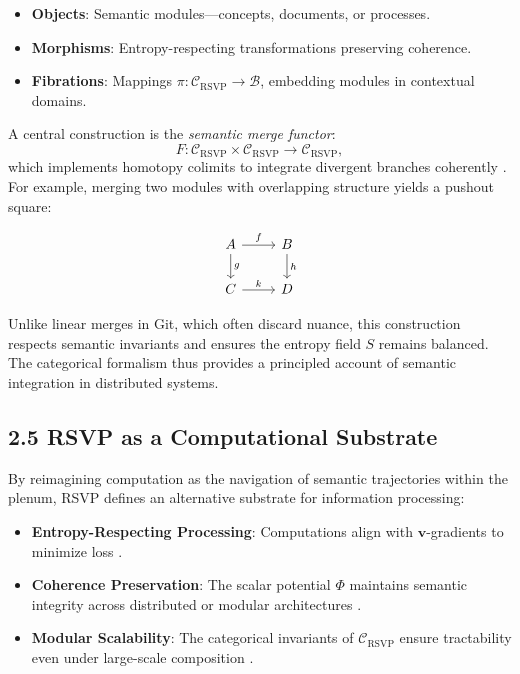 \documentclass[12pt]{article}
\begin{document}
\begin{itemize}
    \item \textbf{Objects}: Semantic modules—concepts, documents, or processes.  
    \item \textbf{Morphisms}: Entropy-respecting transformations preserving coherence.  
    \item \textbf{Fibrations}: Mappings \(\pi : \mathcal{C}_{\text{RSVP}} \to \mathcal{B}\), embedding modules 
    in contextual domains.  
\end{itemize}

A central construction is the \emph{semantic merge functor}:
\[
F : \mathcal{C}_{\text{RSVP}} \times \mathcal{C}_{\text{RSVP}} \to \mathcal{C}_{\text{RSVP}},
\]
which implements homotopy colimits to integrate divergent branches coherently 
\citep{hatcher2002, milewski2018}. For example, merging two modules with overlapping 
structure yields a pushout square:

\[
\begin{tikzcd}
A \arrow[r, "f"] \arrow[d, "g"] & B \arrow[d, "h"] \\
C \arrow[r, "k"] & D
\end{tikzcd}
\]

Unlike linear merges in Git, which often discard nuance, this construction respects 
semantic invariants and ensures the entropy field \(S\) remains balanced. The categorical 
formalism thus provides a principled account of semantic integration in distributed 
systems.

\subsection*{2.5 RSVP as a Computational Substrate}

By reimagining computation as the navigation of semantic trajectories within the plenum, 
RSVP defines an alternative substrate for information processing:

\begin{itemize}
    \item \textbf{Entropy-Respecting Processing}: Computations align with \(\mathbf{v}\)-gradients 
    to minimize loss \citep{cover2006}.
    \item \textbf{Coherence Preservation}: The scalar potential \(\Phi\) maintains semantic integrity 
    across distributed or modular architectures \citep{gromov1999}.
    \item \textbf{Modular Scalability}: The categorical invariants of \(\mathcal{C}_{\text{RSVP}}\) 
    ensure tractability even under large-scale composition \citep{lawvere2009}.
\end{itemize}
\end{document}
